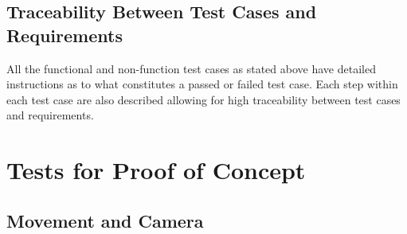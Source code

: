 \documentclass[12pt, titlepage]{article}
\begin{document}
\subsection{Traceability Between Test Cases and Requirements}
All the functional and non-function test cases as stated above have detailed instructions as to what constitutes a passed or failed test case. Each step within each test case are also described allowing for high traceability between test cases and requirements.
\section{Tests for Proof of Concept}

\subsection{Movement and Camera}
		
\end{document}
